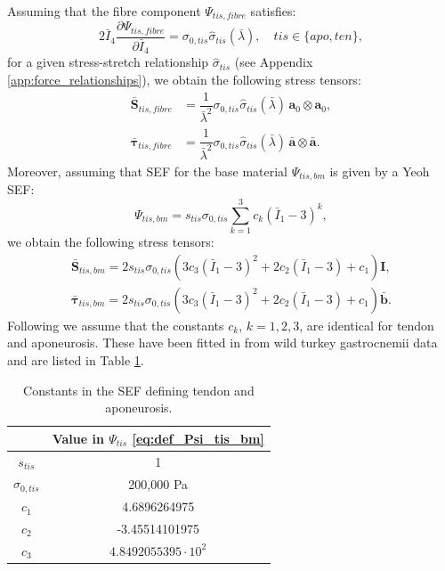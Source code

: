 \documentclass{sfuthesis}
\numberwithin{equation}{section}
\numberwithin{figure}{chapter}
\numberwithin{table}{chapter}
\theoremstyle{definition}
\def\*#1{{\mathbf{#1}}} %
\newcommand{\pder}[2]{\dfrac{\partial #1}{\partial #2}}
\newcommand{\I}{{\bar{I}}}
\def\btau{{\bm{\tau}}}
\begin{document}
Assuming that the fibre component $\Psi_{tis,fibre}$ satisfies:
\begin{equation}
    2 \I_4 \pder{\Psi_{tis,fibre}}{\I_4} = \sigma_{0,tis} \widehat{\sigma}_{tis}(\bar{\lambda}), \quad tis \in \{apo,ten\},
\end{equation}
for a given stress-stretch relationship $\widehat{\sigma}_{tis}$ (see Appendix \ref{app:force_relationships}), we obtain the following stress tensors:
\begin{align}
    \bar{\*S}_{tis,fibre} &= \dfrac{1}{\bar{\lambda}^2} \sigma_{0,tis} \widehat{\sigma}_{tis}(\bar{\lambda}) \, \*a_0 \otimes \*a_0, \\
    \label{eq:def_tau_bar_tis_fibre}\bar{\btau}_{tis,fibre} &= \dfrac{1}{\bar{\lambda}^2} \sigma_{0,tis} \widehat{\sigma}_{tis}(\bar{\lambda}) \, \bar{\*a} \otimes \bar{\*a}.
\end{align}
Moreover, assuming that SEF for the base material $\Psi_{tis,bm}$ is given by a Yeoh SEF:
\begin{equation} \label{eq:def_Psi_tis_bm}
    \Psi_{tis,bm} = s_{tis} \sigma_{0,tis} \sum_{k=1}^3 c_k (\I_1 - 3)^k,
\end{equation}
we obtain the following stress tensors:
\begin{align}
    \bar{\*S}_{tis, bm} = 2 s_{tis} \sigma_{0,tis}  \left( 3c_3(\I_1-3)^2 + 2c_2 (\I_1-3) + c_1 \right) \*I, \\
    \label{eq:def_tau_bar_tis_bm}\bar{\btau}_{tis,bm} = 2 s_{tis} \sigma_{0,tis}  \left( 3c_3(\I_1-3)^2 + 2c_2 (\I_1-3) + c_1 \right) \bar{\*b}.
\end{align}
Following \cite{Seba} we assume that the constants $c_k$, $k=1,2,3$, are identical for tendon and aponeurosis. These have been fitted in \cite{Seba} from wild turkey gastrocnemii data \cite{Azizi2009} and are listed in Table \ref{tab:constants_ten_apo}.

\begin{table}
    \centering
    \begin{tabular}{|c|c|}\hline
        & Value in $\Psi_{tis}$ \eqref{eq:def_Psi_tis_bm} \\\hline
        $s_{tis}$ & 1 \\\hline
        $\sigma_{0,tis}$ & 200,000 \si{Pa} \\\hline
        $c_1$ & 4.6896264975 \\\hline
        $c_2$ & -3.45514101975 \\\hline
        $c_3$ & $4.8492055395 \cdot 10^2$ \\\hline
    \end{tabular}
    \caption{Constants in the SEF defining tendon and aponeurosis. \label{tab:constants_ten_apo}}
\end{table}
\end{document}
